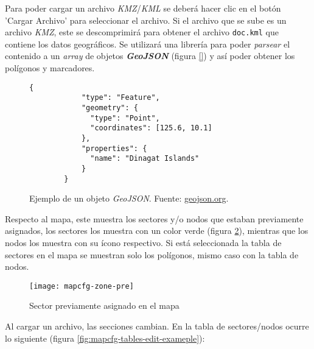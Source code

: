 Para poder cargar un archivo \textit{KMZ}/\textit{KML} se deberá hacer clic en el botón 'Cargar Archivo' para seleccionar el archivo. Si el archivo que se sube es un archivo \textit{KMZ}, este se descomprimirá para obtener el archivo \texttt{doc.kml} que contiene los datos geográficos. Se utilizará una librería para poder \textit{parsear} el contenido a un \textit{array} de objetos \textit{\textbf{GeoJSON}} (figura \ref{}) y así poder obtener los polígonos y marcadores.

\begin{figure}[H]
    \centering
    \begin{lstlisting}[frame=single, basicstyle=\ttfamily\small]
        {
            "type": "Feature",
            "geometry": {
              "type": "Point",
              "coordinates": [125.6, 10.1]
            },
            "properties": {
              "name": "Dinagat Islands"
            }
        }     
    \end{lstlisting}
    \caption{Ejemplo de un objeto \textit{GeoJSON}. Fuente: \href{https://geojson.org/}{geojson.org}.}
    \label{fig:ejemplo-geojson}
\end{figure}

Respecto al mapa, este muestra los sectores y/o nodos que estaban previamente asignados, los sectores los muestra con un color verde (figura \ref{fig:mapcfg-zone-pre}), mientras que los nodos los muestra con su ícono respectivo. Si está seleccionada la tabla de sectores en el mapa se muestran solo los polígonos, mismo caso con la tabla de nodos.
\begin{figure}[H]
	\centering
	\texttt{[image: mapcfg-zone-pre]}
	\caption{\label{fig:mapcfg-zone-pre} Sector previamente asignado en el mapa}
\end{figure}

Al cargar un archivo, las secciones cambian. En la tabla de sectores/nodos ocurre lo siguiente (figura \ref{fig:mapcfg-tables-edit-exameple}):

